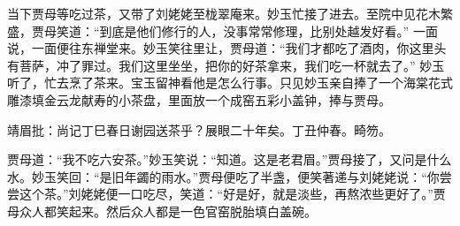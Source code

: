 \begin{parag}


    当下贾母等吃过茶，又带了刘姥姥至栊翠庵来。妙玉忙接了进去。至院中见花木繁盛，贾母笑道：“到底是他们修行的人，没事常常修理，比别处越发好看。” 一面说，一面便往东禅堂来。妙玉笑往里让，贾母道：“我们才都吃了酒肉，你这里头有菩萨，冲了罪过。我们这里坐坐，把你的好茶拿来，我们吃一杯就去了。” 妙玉听了，忙去烹了茶来。宝玉留神看他是怎么行事。只见妙玉亲自捧了一个海棠花式雕漆填金云龙献寿的小茶盘，里面放一个成窑五彩小盖钟，捧与贾母。\begin{note}靖眉批：尚记丁巳春日谢园送茶乎？展眼二十年矣。丁丑仲春。畸笏。\end{note}贾母道：“我不吃六安茶。”妙玉笑说：“知道。这是老君眉。”贾母接了，又问是什么水。妙玉笑回：“是旧年蠲的雨水。”贾母便吃了半盏，便笑著递与刘姥姥说：“你尝尝这个茶。”刘姥姥便一口吃尽，笑道：“好是好，就是淡些，再熬浓些更好了。”贾母众人都笑起来。然后众人都是一色官窑脱胎填白盖碗。
\end{parag}


